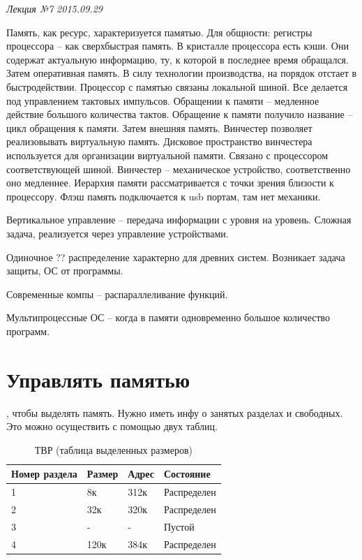 \clearpage
\begin{flushright}
	\textit{Лекция №7}
	\textit{2015.09.29}
\end{flushright}

Память, как ресурс, характеризуется памятью. Для общности: регистры процессора – как сверхбыстрая память. В кристалле процессора есть кэши. Они содержат актуальную информацию, ту, к которой в последнее время обращался. Затем оперативная память. В силу технологии производства, на порядок отстает в быстродействии. Процессор с памятью связаны локальной шиной. Все делается под управлением тактовых импульсов. Обращении к памяти – медленное действие большого количества тактов. Обращение к памяти получило название – цикл обращения к памяти. Затем внешняя память. Винчестер позволяет реализовывать виртуальную память. Дисковое пространство винчестера используется для организации виртуальной памяти. Связано с процессором соответствующей шиной. Винчестер – механическое устройство, соответственно оно медленнее. Иерархия памяти рассматривается с точки зрения близости к процессору. Флэш память подключается к usb портам, там нет механики. 

Вертикальное управление – передача информации с уровня на уровень. Сложная задача, реализуется через управление устройствами.

Одиночное ?? распределение характерно для древних систем. Возникает задача защиты, ОС от программы.

Современные компы – распараллеливание функций.

Мультипроцессные ОС – когда в памяти одновременно большое количество программ.

\section{Управлять памятью}, чтобы выделять память. Нужно иметь инфу о занятых разделах и свободных. Это можно осуществить с помощью двух таблиц. 

\begin{table}[H]
\caption{ТВР (таблица выделенных размеров)}
\begin{tabular}{|l|l|l|l|}
\hline
Номер раздела & Размер & Адрес & Состояние \\
\hline
1 & 8к & 312к & Распределен \\ 
\hline
2 & 32к & 320к & Распределен \\
\hline
3 & - & - & Пустой \\
\hline
4 & 120к & 384к & Распределен\\
\hline
\end{tabular}
\end{table}

